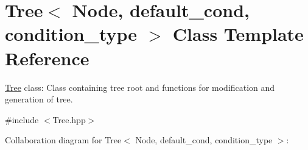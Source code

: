 \hypertarget{class_tree}{}\section{Tree$<$ Node, default\+\_\+cond, condition\+\_\+type $>$ Class Template Reference}
\label{class_tree}


\hyperlink{class_tree}{Tree} class\+: Class containing tree root and functions for modification and generation of tree.  




{\ttfamily \#include $<$Tree.\+hpp$>$}



Collaboration diagram for Tree$<$ Node, default\+\_\+cond, condition\+\_\+type $>$\+:
